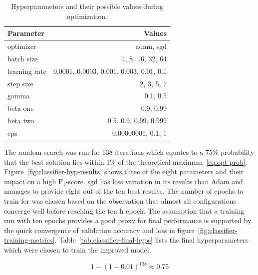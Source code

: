\documentclass[final]{vutinfth} %
\begin{document}
\begin{table}[h]
  \centering
  \begin{tabular}{lr}
    \toprule
    Parameter &  Values \\
    \midrule
    optimizer &	adam, sgd \\
    batch size & 4, 8, 16, 32, 64 \\
    learning rate & 0.0001, 0.0003, 0.001, 0.003, 0.01, 0.1 \\
    step size & 2, 3, 5, 7 \\
    gamma & 0.1, 0.5 \\
    beta one & 0.9, 0.99 \\
    beta two & 0.5, 0.9, 0.99, 0.999 \\
    eps & 0.00000001, 0.1, 1 \\
    \bottomrule
  \end{tabular}
  \caption{Hyperparameters and their possible values during
    optimization.}
  \label{tab:classifier-hyps}
\end{table}

The random search was run for \num{138} iterations which equates to a
75\% probability that the best solution lies within 1\% of the
theoretical
maximum~\eqref{eq:opt-prob}. Figure~\ref{fig:classifier-hyp-results}
shows three of the eight parameters and their impact on a high
$\mathrm{F}_1$-score. \gls{sgd} has less variation in its results than
Adam \cite{kingma2017} and manages to provide eight out of the ten
best results. The number of epochs to train for was chosen based on
the observation that almost all configurations converge well before
reaching the tenth epoch. The assumption that a training run with ten
epochs provides a good proxy for final performance is supported by the
quick convergence of validation accuracy and loss in
figure~\ref{fig:classifier-training-metrics}. Table~\ref{tab:classifier-final-hyps}
lists the final hyperparameters which were chosen to train the
improved model.

\begin{equation}\label{eq:opt-prob}
  1 - (1 - 0.01)^{138} \approx 0.75
\end{equation}
\end{document}
